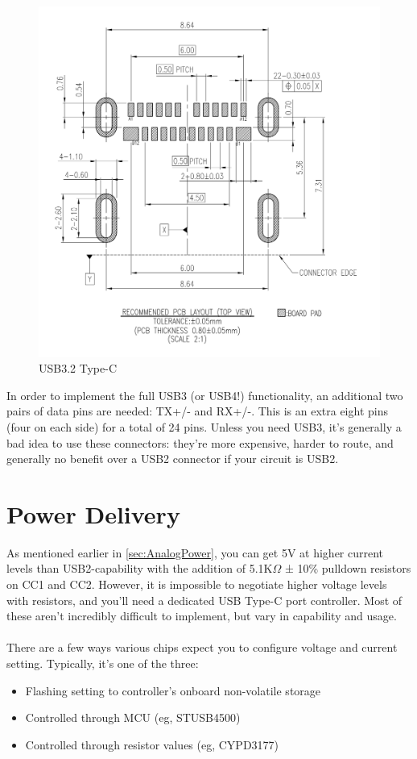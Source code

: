 \documentclass[12pt]{article}
\begin{document}
\begin{figure}[h]
	\centering
	\includegraphics[width=.8\linewidth]{images/Amphenol-USB3.2-Type-C.png}
	\caption{USB3.2 Type-C\protect\footnotemark}
	\label{fig:usb-c-pinout-usb3.2-amphenol}
\end{figure}


\noindent
In order to implement the full USB3 (or USB4!) functionality, an additional two pairs of data pins are needed: TX+/- and RX+/-. This is an extra eight pins (four on each side) for a total of 24 pins. Unless you need USB3, it's generally a bad idea to use these connectors: they're more expensive, harder to route, and generally no benefit over a USB2 connector if your circuit is USB2. 


\newpage
\section{Power Delivery}

As mentioned earlier in \ref{sec:AnalogPower}, you can get 5V at higher current levels than USB2-capability with the addition of 5.1K$\Omega$ ± 10\% pulldown resistors on CC1 and CC2. However, it is impossible to negotiate higher voltage levels with resistors, and you'll need a dedicated USB Type-C port controller. Most of these aren't incredibly difficult to implement, but vary in capability and usage. \\\\
\noindent
There are a few ways various chips expect you to configure voltage and current setting. Typically, it's one of the three:
\begin{itemize}
	\item Flashing setting to controller's onboard non-volatile storage
	\item Controlled through MCU (eg, STUSB4500)
	\item Controlled through resistor values (eg, CYPD3177)\\
\end{itemize}
\end{document}
